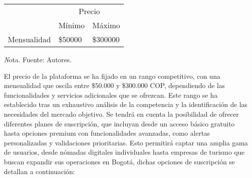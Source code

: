 \begin{adjustbox}{
            center,
            caption=[{Precio en el mercado actual}]{\centering Precio en el mercado actual (Valores en pesos colombianos COP). },
            label={Precio},
            nofloat=table, vspace={20px}}
            {
            \begin{threeparttable}
           \begin{tabular}{|p{11cm}|p{10cm}p{2cm}|}
                \hline
                \rowcolor[HTML]{D9EAD3} 
                \cellcolor[HTML]{D9EAD3}                              & \multicolumn{2}{c|}{\cellcolor[HTML]{D9EAD3}Precio}            \\ \cline{2-3} 
                \rowcolor[HTML]{D9EAD3} 
                \multirow{-2}{*}{\cellcolor[HTML]{D9EAD3}Suscripción} & \multicolumn{1}{l|}{\cellcolor[HTML]{D9EAD3}Mínimo} & Máximo   \\ \hline
                \multicolumn{1}{|l|}{Mensualidad}                     & \multicolumn{1}{l|}{\$50000}                       & \$300000 \\ \hline
            \end{tabular}
            \begin{tablenotes}
                \vspace{2mm}
               \textit Nota. Fuente: Autores.
            \end{tablenotes}
            
        \end{threeparttable} 
    }

\end{adjustbox}

El precio de la plataforma se ha fijado en un rango competitivo, con una mensualidad que oscila entre \$50.000 y \$300.000 COP, dependiendo de las funcionalidades y servicios adicionales que se ofrezcan. Este rango se ha establecido tras un exhaustivo análisis de la competencia y la identificación de las necesidades del mercado objetivo.
Se tendrá en cuenta la posibilidad de ofrecer diferentes planes de suscripción, que incluyan desde un acceso básico gratuito hasta opciones premium con funcionalidades avanzadas, como alertas personalizadas y validaciones prioritarias. Esto permitirá captar una amplia gama de usuarios, desde nómadas digitales individuales hasta empresas de turismo que buscan expandir sus operaciones en Bogotá, dichas opciones de suscripción se detallan a continuación:


